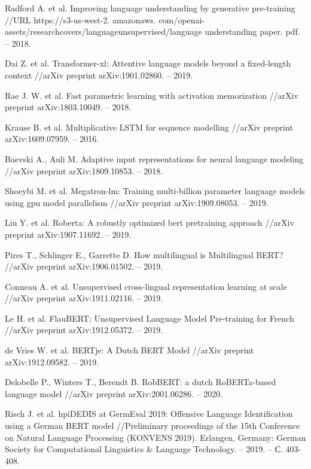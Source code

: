 \begin{thebibliography}{00}
    Radford A. et al. Improving language understanding by generative pre-training //URL https://s3-us-west-2. amazonaws. com/openai-assets/researchcovers/languageunsupervised/language understanding paper. pdf. – 2018.
    
    Dai Z. et al. Transformer-xl: Attentive language models beyond a fixed-length context //arXiv preprint arXiv:1901.02860. – 2019.
    
    Rae J. W. et al. Fast parametric learning with activation memorization //arXiv preprint arXiv:1803.10049. – 2018.
    
    Krause B. et al. Multiplicative LSTM for sequence modelling //arXiv preprint arXiv:1609.07959. – 2016.
    
    Baevski A., Auli M. Adaptive input representations for neural language modeling //arXiv preprint arXiv:1809.10853. – 2018.

    Shoeybi M. et al. Megatron-lm: Training multi-billion parameter language models using gpu model parallelism //arXiv preprint arXiv:1909.08053. – 2019.
    
    Liu Y. et al. Roberta: A robustly optimized bert pretraining approach //arXiv preprint arXiv:1907.11692. – 2019.
    
    Pires T., Schlinger E., Garrette D. How multilingual is Multilingual BERT? //arXiv preprint arXiv:1906.01502. – 2019.
    
    Conneau A. et al. Unsupervised cross-lingual representation learning at scale //arXiv preprint arXiv:1911.02116. – 2019.
    
    Le H. et al. FlauBERT: Unsupervised Language Model Pre-training for French //arXiv preprint arXiv:1912.05372. – 2019.
    
    de Vries W. et al. BERTje: A Dutch BERT Model //arXiv preprint arXiv:1912.09582. – 2019.
    
    Delobelle P., Winters T., Berendt B. RobBERT: a dutch RoBERTa-based language model //arXiv preprint arXiv:2001.06286. – 2020.
    
    Risch J. et al. hpiDEDIS at GermEval 2019: Offensive Language Identification using a German BERT model //Preliminary proceedings of the 15th Conference on Natural Language Processing (KONVENS 2019). Erlangen, Germany: German Society for Computational Linguistics & Language Technology. – 2019. – С. 403-408.
    

\end{thebibliography}

